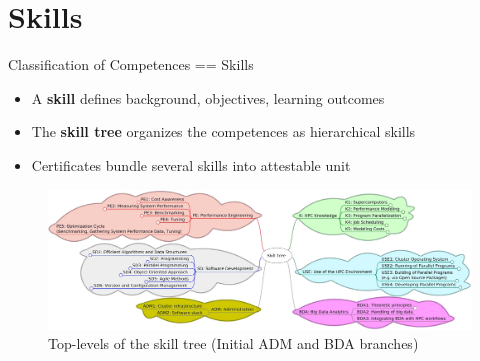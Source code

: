 \documentclass[compress,aspectratio=169]{beamer}
\begin{document}
\section{Skills}
\sectionIntroHidden

\begin{frame}{Classification of Competences == Skills}
	\begin{itemize}
		\item A \textbf{skill} defines background, objectives, learning outcomes
		\item The \textbf{skill tree} organizes the competences as hierarchical skills
		\item Certificates bundle several skills into attestable unit
	\end{itemize}

	\begin{figure}
		\includegraphics[width=\textwidth]{skill-tree}
		\vspace*{-2em}
		\caption{Top-levels of the skill tree (Initial ADM and BDA branches)}
	\end{figure}
\end{frame}
\end{document}
